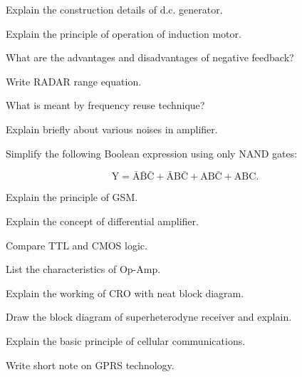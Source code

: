 \Or

\item \iitem Explain the construction details of d.c. generator.

\item Explain the principle of operation of induction motor.

\ene\ene\ene



\sectionD

\partA

\iitem What are the advantages and disadvantages of negative feedback? 

\item Write RADAR range equation. \marka

\item What is meant by frequency reuse technique? 

\partBt

\item Explain briefly about various noises in amplifier.

\item Simplify the following Boolean expression using only NAND gates:

\[ \text{Y} = \bar{\text{A}}\bar{\text{B}}\bar{\text{C}} + \bar{\text{A}}\text{B} \bar{\text{C}} + \text{AB}\bar{\text{C}} + \text{ABC}.\]


\item Explain the principle of GSM. 


\partCo


\item \iitem \iitem Explain the concept of differential amplifier.  

\item Compare TTL and CMOS logic. 

\item List the characteristics of Op-Amp. 

\ene

\Or

\item Explain the working of CRO with neat block diagram. 

\ene

\newpage

\item \iitem Draw the block diagram of superheterodyne receiver and explain. 

\Or

\item \iitem Explain the basic principle of cellular communications. 

\item Write short note on GPRS technology. 

\ene
\ene
\ene
